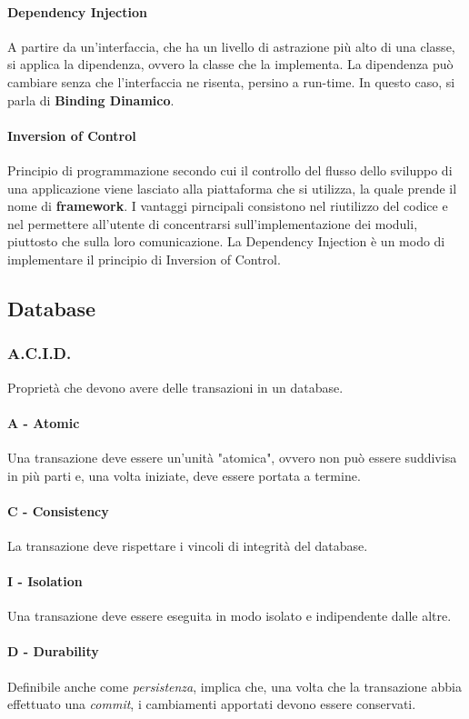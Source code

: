 \documentclass{article}
\begin{document}
            \paragraph{Dependency Injection} A partire da un'interfaccia, che ha un livello di astrazione più alto di una classe, si applica la dipendenza, ovvero la classe che la implementa. La dipendenza può cambiare senza che l'interfaccia ne risenta, persino a run-time. In questo caso, si parla di \textbf{Binding Dinamico}.
            \paragraph{Inversion of Control} Principio di programmazione secondo cui il controllo del flusso dello sviluppo di una applicazione viene lasciato alla piattaforma che si utilizza, la quale prende il nome di \textbf{framework}. I vantaggi pirncipali consistono nel riutilizzo del codice e nel permettere all'utente di concentrarsi sull'implementazione dei moduli, piuttosto che sulla loro comunicazione. La Dependency Injection è un modo di implementare il principio di Inversion of Control.
    \subsection{Database}
        \subsubsection{A.C.I.D.}
            Proprietà che devono avere delle transazioni in un database.
            \paragraph{A - Atomic} Una transazione deve essere un'unità "atomica", ovvero non può essere suddivisa in più parti e, una volta iniziate, deve essere portata a termine.
            \paragraph{C - Consistency} La transazione deve rispettare i vincoli di integrità del database.
            \paragraph{I - Isolation} Una transazione deve essere eseguita in modo isolato e indipendente dalle altre.
            \paragraph{D - Durability} Definibile anche come \textit{persistenza}, implica che, una volta che la transazione abbia effettuato una \textit{commit}, i cambiamenti apportati devono essere conservati. 
\end{document}
